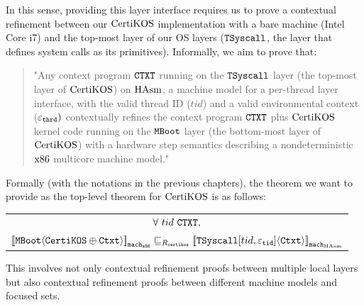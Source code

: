 In this sense, providing this layer interface requires us 
to prove a contextual refinement between our $\mathrm{CertiKOS}$ implementation with a bare machine (Intel Core i7) and 
the top-most layer of our OS layers (${\mathrm{\texttt{TSyscall}}}$, the layer that defines system calls as its primitives).
Informally, we aim to prove that:
\begin{quote}
"Any context program ${\mathrm{\texttt{CTXT}}}$ running on the ${\mathrm{\texttt{TSyscall}}}$ layer (the top-most layer of $\mathrm{CertiKOS}$) on $\mathrm{HAsm}$, a machine model for a per-thread layer interface, with the valid thread ID ($tid$)
and a valid environmental context (${\varepsilon}_{{\mathrm{\texttt{thrd}}}})$ 
contextually refines the context program ${\mathrm{\texttt{CTXT}}}$ plus $\mathrm{CertiKOS}$ kernel code running on the ${\mathrm{\texttt{MBoot}}}$ layer (the bottom-most layer of $\mathrm{CertiKOS}$) with a hardware step semantics describing a nondeterministic $\mathrm{x86}$ multicore machine model."
\end{quote}
Formally (with the notations in the previous chapters), the theorem we want to provide as the top-level theorem for $\mathrm{CertiKOS}$ is as follows:
 \begin{center}
\begin{tabular}{c}
$\forall\ tid\  \codeinmath{CTXT},$\\
${[\![{{\mathrm{\texttt{MBoot}}}} \langle {{\mathrm{\texttt{CertiKOS}}} \oplus {\mathrm{\texttt{Ctxt}}}} \rangle]\!]}_{{\mathrm{\texttt{mach}}}_{{\mathrm{\texttt{x86}}}}} \sqsubseteq_{R_{{\mathrm{\texttt{certikos}}}}} {[\![{{\mathrm{\texttt{TSyscall}}}[tid, {\varepsilon}_{{\mathrm{\texttt{tid}}}}]} \langle {{\mathrm{\texttt{Ctxt}}}} \rangle]\!]}_{{{\mathrm{\texttt{mach}}}_{\mathrm{HAsm}}}}$\\
\end{tabular}
\end{center}
This involves not only contextual refinement proofs between multiple local layers but also contextual refinement proofs between
different machine models and focused sets.

